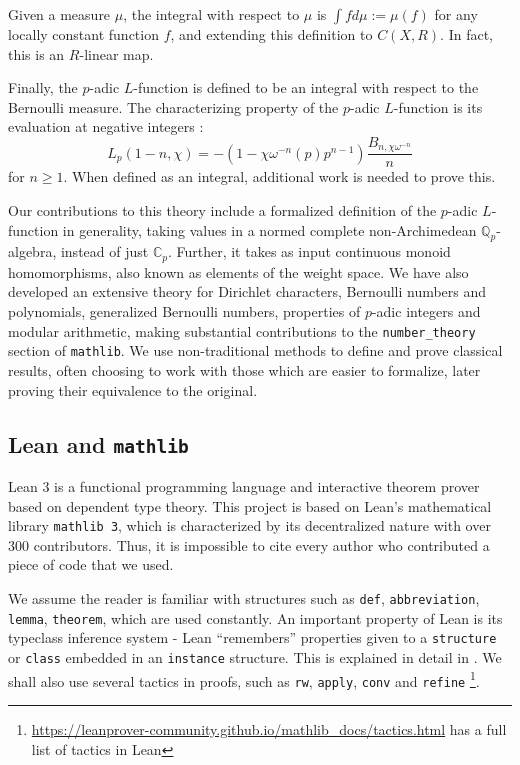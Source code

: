\documentclass[a4paper,UKenglish,cleveref, autoref, thm-restate,pdfa]{lipics-v2021}
\newcommand{\lean}[1]{\texttt{#1}\xspace} %
\begin{document}
Given a measure $\mu$, the integral with respect to $\mu$ is 
$\int f d\mu := \mu (f)$ for any locally constant function $f$, and 
extending this definition to $C(X, R)$. In fact, this is an $R$-linear map. 

Finally, the $p$-adic $L$-function is defined to be an integral with respect to the Bernoulli 
measure. The characterizing property of the $p$-adic $L$-function is its evaluation at negative integers : 
$$ L_p (1 - n, \chi) = -(1 - \chi \omega^{-n}(p)p^{n - 1}) \frac{B_{n, \chi \omega^{-n}}}{n} $$
for $n \ge 1$. When defined as an integral, additional work is needed to prove this. 

Our contributions to this theory include a formalized definition of the $p$-adic $L$-function in generality, 
taking values in a normed complete non-Archimedean $\mathbb{Q}_p$-algebra, instead of just $\mathbb{C}_p$. Further, it takes as 
input continuous monoid homomorphisms, also known as elements of the weight space. We have also developed an extensive theory for 
Dirichlet characters, Bernoulli numbers and polynomials, generalized Bernoulli numbers, properties of $p$-adic integers and modular arithmetic, 
making substantial contributions to the \lean{number\_theory} section of \lean{mathlib}. 
We use non-traditional methods to define and prove classical results, often choosing to work with those which are easier to formalize, 
later proving their equivalence to the original. 

\subsection{Lean and \lean{mathlib}}
Lean 3 is a functional programming language and interactive theorem prover based on
dependent type theory. This project is based on Lean’s 
mathematical library \lean{mathlib 3}, which is characterized by
its decentralized nature with over 300 contributors. Thus, it is impossible to cite every author who contributed a piece of code that we used.

We assume the reader is familiar with structures such as \lean{def}, \lean{abbreviation}, \lean{lemma}, \lean{theorem}, which are used constantly. 
An important property of Lean is its typeclass inference system - 
Lean ``remembers'' properties given to a \lean{structure} or \lean{class} embedded in an \lean{instance} structure. This is explained in detail in \cite{mathlib}. 
We shall also use several tactics in proofs, such as \lean{rw}, \lean{apply}, \lean{conv} and \lean{refine}
\footnote{\url{https://leanprover-community.github.io/mathlib_docs/tactics.html} has a full list of tactics in Lean}.
\end{document}
